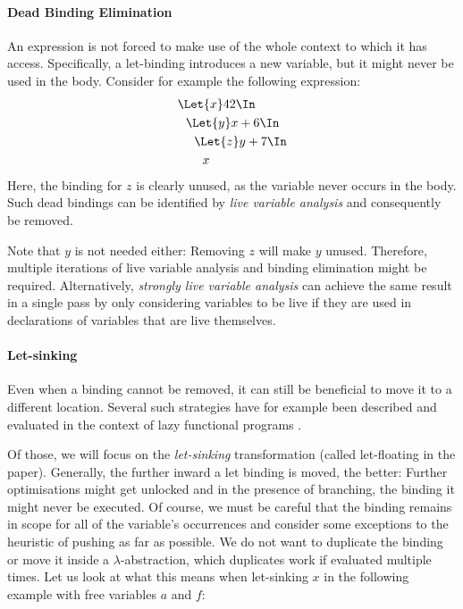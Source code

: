   \paragraph{Dead Binding Elimination}
    An expression is not forced to make use of the whole context to which it has access.
    Specifically, a let-binding introduces a new variable, but it might never be used
    in the body.
    Consider for example the following expression:
    \begin{align*}
      &\Let{x} 42 \In            \\
      &\ \ \Let{y} x + 6 \In     \\
      &\ \ \ \ \Let{z} y + 7 \In \\
      &\ \ \ \ \ \ x
    \end{align*}
    Here, the binding for $z$ is clearly unused, as the variable never occurs in the body.
    Such dead bindings can be identified by \emph{live variable analysis}
    and consequently be removed.

    Note that $y$ is not needed either: Removing $z$ will make $y$ unused.
    Therefore, multiple iterations of live variable analysis and binding elimination might be required.
    Alternatively, \emph{strongly live variable analysis} can achieve the same result in a single pass
    by only considering variables to be live
    if they are used in declarations of variables that are live themselves.
  \paragraph{Let-sinking}
    Even when a binding cannot be removed,
    it can still be beneficial to move it to a different location.
    Several such strategies have for example been described and evaluated
    in the context of lazy functional programs
    \cite{Jones1996LetFloating}.

    Of those, we will focus on the \emph{let-sinking} transformation
    (called let-floating in the paper).
    Generally, the further inward a let binding is moved, the better:
    Further optimisations might get unlocked and in the presence of branching,
    the binding it might never be executed.
    Of course, we must be careful that the binding remains in scope
    for all of the variable's occurrences
    and consider some exceptions to the heuristic of pushing as far as possible.
    We do not want to duplicate the binding
    or move it inside a $\lambda$-abstraction, which duplicates work
    if evaluated multiple times.
    Let us look at what this means when let-sinking $x$ in the following example with free variables $a$ and $f$:


